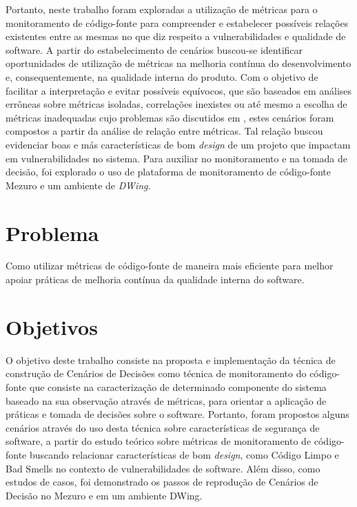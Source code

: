 %

Portanto, neste trabalho foram exploradas a utilização de métricas para o monitoramento de código-fonte para compreender e estabelecer possíveis relações existentes entre as mesmas no que diz respeito a vulnerabilidades e qualidade de software. A partir do estabelecimento de cenários buscou-se identificar oportunidades de utilização de métricas na melhoria contínua do desenvolvimento e, consequentemente, na qualidade interna do produto. Com o objetivo de facilitar a interpretação e evitar possíveis equívocos, que são baseados em análises errôneas sobre métricas isoladas, correlações inexistes ou até mesmo a escolha de métricas inadequadas cujo problemas são discutidos em \cite{chidamber1994}, estes cenários foram compostos a partir da análise de relação entre métricas. Tal relação buscou evidenciar boas e más características de bom \emph{design} de um projeto que impactam em vulnerabilidades no sistema.
%
Para auxiliar no monitoramento e na tomada de decisão, foi explorado o uso de plataforma de monitoramento de código-fonte Mezuro e um ambiente de \emph{DWing}.



\section{Problema}

%
Como utilizar métricas de código-fonte de maneira mais eficiente para melhor apoiar práticas de melhoria contínua da qualidade interna do software.

\section{Objetivos}

O objetivo deste trabalho consiste na proposta e implementação da técnica de construção de Cenários de Decisões como técnica de monitoramento do código-fonte que consiste na caracterização de determinado componente do sistema baseado na sua observação através de métricas, para orientar a aplicação de práticas e tomada de decisões sobre o software. Portanto, foram propostos alguns cenários através do uso desta técnica sobre características de segurança de software, a partir do estudo teórico sobre métricas de monitoramento de código-fonte buscando relacionar características de bom \emph{design}, como Código Limpo e Bad Smells no contexto de vulnerabilidades de software. Além disso, como estudos de casos, foi demonstrado os passos de reprodução de Cenários de Decisão no Mezuro e em um ambiente DWing.

